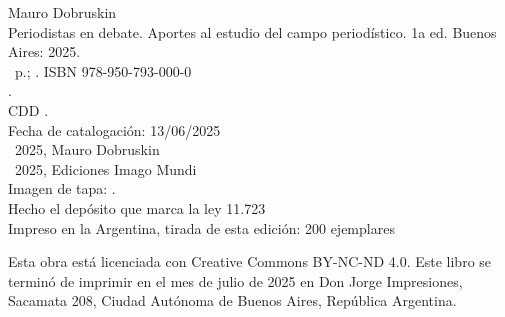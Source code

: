\noindent Mauro Dobruskin \\
\noindent Periodistas en debate. Aportes al estudio del campo periodístico. 1a ed. Buenos Aires: 2025.\\
\noindent \ztotpages\ p.; \valorEspecifico. ISBN 978-950-793-000-0 \\
. \\
\noindent CDD .\\
\noindent Fecha de catalogación: 13/06/2025 \\
\noindent \textcopyright~2025, Mauro Dobruskin \\
\noindent \textcopyright~2025, Ediciones Imago Mundi\\
\noindent Imagen de tapa: .\\
\noindent Hecho el depósito que marca la ley 11.723\\
\noindent Impreso en la Argentina, tirada de esta edición: 200 ejemplares\\

\vfill

\noindent {}\bigskip

\noindent Esta obra está licenciada con Creative Commons BY-NC-ND 4.0.
\noindent Este libro se terminó de imprimir en el mes de julio de 2025 en Don Jorge Impresiones, Sacamata 208, Ciudad Autónoma de Buenos Aires, República Argentina.
